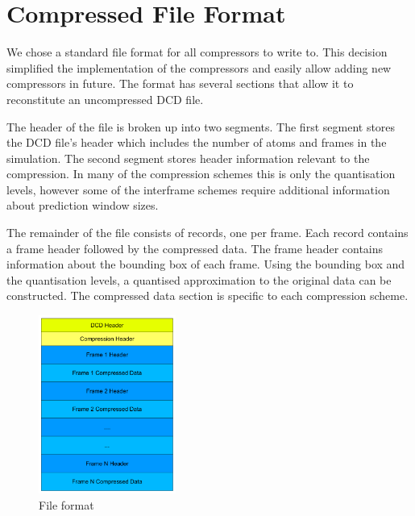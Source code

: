 \documentclass[a4paper,11pt]{report}
\begin{document}

\section{Compressed File Format}

We chose a standard file format for all compressors to write to. This decision simplified the implementation of the compressors and easily allow adding new compressors in future. The format has several sections that allow it to reconstitute an uncompressed DCD file.

The header of the file is broken up into two segments. The first segment stores the DCD file's header which includes the number of atoms and frames in the simulation. The second segment stores header information relevant to the compression. In many of the compression schemes this is only the quantisation levels, however some of the interframe schemes require additional information about prediction window sizes.

The remainder of the file consists of records, one per frame. Each record contains a frame header followed by the compressed data. The frame header contains information about the bounding box of each frame. Using the bounding box and the quantisation levels, a quantised approximation to the original data can be constructed. The compressed data section is specific to each compression scheme.

\begin{figure}
 \center
 \includegraphics[width=0.4\textwidth]{resources/FileFormat.png}
\caption{File format}
\label{sysbreak}
\end{figure}

\end{document}
